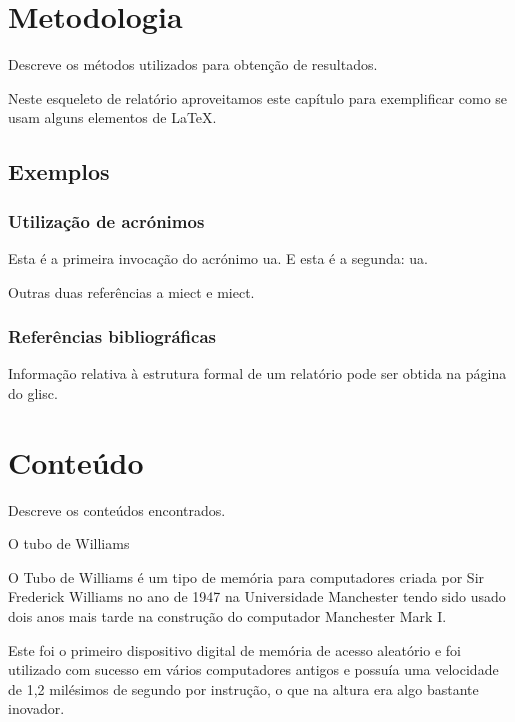 \documentclass{report}
\begin{document}
\chapter{Metodologia}
\label{chap.metodologia}
Descreve os métodos utilizados para obtenção de resultados.

Neste esqueleto de relatório aproveitamos este capítulo para exemplificar
como se usam alguns elementos de {\LaTeX}.

\section{Exemplos}

\subsection{Utilização de acrónimos}
Esta é a primeira invocação do acrónimo \ac{ua}.
E esta é a segunda: \ac{ua}.

Outras duas referências a \ac{miect}
e \ac{miect}.

\subsection{Referências bibliográficas}
Informação relativa à estrutura formal de um relatório pode ser obtida
na página do \ac{glisc}\cite{glisc}.

\chapter{Conteúdo}
\label{chap.conteúdo}
Descreve os conteúdos encontrados.

\maketitle O tubo de Williams

	
	O Tubo de Williams é um tipo de memória para computadores criada por Sir Frederick Williams no ano de 1947 na Universidade Manchester tendo sido usado dois anos mais tarde na construção do computador Manchester Mark I.
\vspace{1mm}
	
	Este foi o primeiro dispositivo digital de memória de acesso aleatório e foi utilizado com sucesso em vários computadores antigos e possuía uma velocidade de 1,2 milésimos de segundo por instrução, o que na altura era algo bastante inovador.
\vspace{1mm}
	
\end{document}
